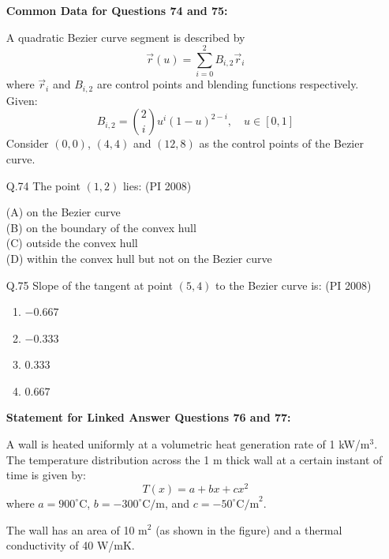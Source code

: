 \documentclass[journal,12pt,onecolumn]{IEEEtran}
\theoremstyle{remark}
\begin{document}
\begin{enumerate}
\begin{multicols}{4}
\begin{enumerate}[label=(\Alph*)]
 \end{enumerate}
\end{multicols}
\vspace{1cm}
\textbf{Common Data for Questions 74 and 75:}  

A quadratic Bezier curve segment is described by  
\[
\vec{r}(u) = \sum_{i=0}^{2} B_{i,2} \vec{r}_i
\]
where $\vec{r}_i$ and $B_{i,2}$ are control points and blending functions respectively.  
Given:  
\[
B_{i,2} = \binom{2}{i} u^i (1-u)^{2-i}, \quad u \in [0,1]
\]
Consider $(0,0)$, $(4,4)$ and $(12,8)$ as the control points of the Bezier curve.

\vspace{0.4cm}
\noindent
\item[\textnormal{Q.74}] The point $(1,2)$ lies:  \hfill{(PI 2008)}

(A) on the Bezier curve \\
(B) on the boundary of the convex hull \\
(C) outside the convex hull \\
(D) within the convex hull but not on the Bezier curve \\

\vspace{1cm}
\noindent
\item[\textnormal{Q.75}] Slope of the tangent at point $(5,4)$ to the Bezier curve is: \hfill{(PI 2008)}
\begin{multicols}{4}
    \begin{enumerate}[label=(\Alph*)]
\item  $-0.667$ 
\item $-0.333$ 
\item $0.333$
\item $0.667$

 \end{enumerate}
\end{multicols}
\vspace{1cm}

\textbf{Statement for Linked Answer Questions 76 and 77:}

A wall is heated uniformly at a volumetric heat generation rate of 1 kW/m$^3$.  
The temperature distribution across the 1 m thick wall at a certain instant of time is given by:  
\[
T(x) = a + b x + c x^2
\]
where $a = 900^\circ \text{C}$, $b = -300^\circ \text{C/m}$, and $c = -50^\circ \text{C/m}^2$.  

The wall has an area of 10 m$^2$ (as shown in the figure) and a thermal conductivity of 40 W/mK.


\end{enumerate}
\end{document}
